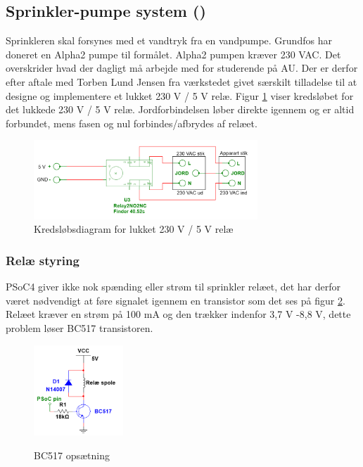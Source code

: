 
\subsection{Sprinkler-pumpe system ()}

Sprinkleren skal forsynes med et vandtryk fra en vandpumpe. Grundfos har doneret en Alpha2 pumpe til formålet. Alpha2 pumpen kræver 230 VAC. Det overskrider hvad der dagligt må arbejde med for studerende på AU. Der er derfor efter aftale med Torben Lund Jensen fra værkstedet givet særskilt tilladelse til at designe og implementere et lukket 230 V / 5 V relæ. Figur \ref{lab:Relay_box} viser kredsløbet for det lukkede 230 V / 5 V relæ. Jordforbindelsen løber direkte igennem og er altid forbundet, mens fasen og nul forbindes/afbrydes af relæet.  

\begin{figure}[H]
  \centering
    \includegraphics[width=0.75\textwidth]{Billeder/230VAC_KREDS}
    \caption{Kredsløbsdiagram for lukket 230 V / 5 V relæ}
    \label{lab:Relay_box}
\end{figure}

\subsubsection{Relæ styring}

PSoC4 giver ikke nok spænding eller strøm til sprinkler relæet, det har derfor været nødvendigt at føre signalet igennem en transistor som det ses på figur \ref{lab:BC517}. Relæet kræver en strøm på 100 mA og den trækker indenfor 3,7 V -8,8 V, dette problem løser BC517 transistoren. 

\begin{figure}[H] \centering
{\includegraphics[width=0.3\textwidth]{Billeder/BC517}}
\caption{BC517 opsætning}
\label{lab:BC517}
\raggedright
\end{figure} 

